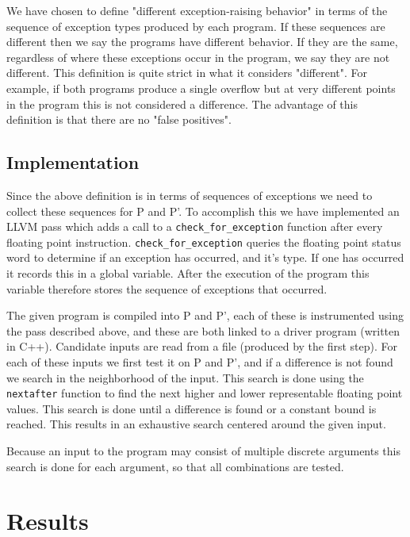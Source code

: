 \documentclass{article}
\begin{document}
We have chosen to define "different exception-raising behavior" in terms of the
sequence of exception types produced by each program. If these sequences are
different then we say the programs have different behavior. If they are the
same, regardless of where these exceptions occur in the program, we say they are
not different. This definition is quite strict in what it considers "different".
For example, if both programs produce a single overflow but at very different
points in the program this is not considered a difference. The advantage of this
definition is that there are no "false positives".

\subsection{Implementation}

Since the above definition is in terms of sequences of exceptions we need to
collect these sequences for P and P'. To accomplish this we have implemented an
LLVM pass which adds a call to a \texttt{check_for_exception} function after
every floating point instruction. \texttt{check_for_exception} queries the
floating point status word \cite{noauthor_status_nodate} to determine if an
exception has occurred, and it's type. If one has occurred it records this in a
global variable. After the execution of the program this variable therefore
stores the sequence of exceptions that occurred.

The given program is compiled into P and P', each of these is instrumented using
the pass described above, and these are both linked to a driver program (written
in C++). Candidate inputs are read from a file (produced by the first step).
For each of these inputs we first test it on P and P', and if a difference is
not found we search in the neighborhood of the input. This search is done using
the \texttt{nextafter} function \cite{noauthor_nextafter3_nodate} to find the
next higher and lower representable floating point values. This search is done
until a difference is found or a constant bound is reached. This results in an
exhaustive search centered around the given input.

Because an input to the program may consist of multiple discrete arguments this
search is done for each argument, so that all combinations are tested.

\section{Results}
\end{document}
